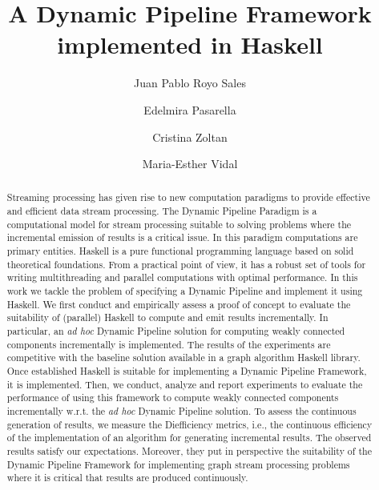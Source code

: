 \documentclass[preprint]{elsarticle}
\begin{document}
\title{A Dynamic Pipeline Framework implemented in Haskell}

%
\author[1]{Juan Pablo Royo Sales}

\author[1]{Edelmira Pasarella}

\author[1]{Cristina Zoltan}

\author[2]{Maria-Esther Vidal}



\begin{abstract}
Streaming processing has given rise to new computation paradigms to provide effective and efficient data stream processing. 
The Dynamic Pipeline Paradigm is a computational model for stream processing suitable to solving problems where the incremental emission of results is a critical  issue. In this paradigm computations are primary entities. Haskell is a pure functional programming language based on solid theoretical foundations. From a practical point of view, it has a robust set of tools for writing multithreading and parallel computations with optimal performance. In this work we tackle the problem of specifying a Dynamic Pipeline  and implement it using Haskell. We first conduct and empirically assess a proof of concept to evaluate the suitability of (parallel) Haskell to compute and emit results incrementally. In particular, an \textit{ad hoc} Dynamic Pipeline solution for computing weakly connected components incrementally is implemented. The results of the experiments are competitive with the baseline solution available in a graph algorithm Haskell library. Once established Haskell is suitable for implementing a Dynamic Pipeline Framework, it is implemented. Then, we conduct, analyze and report experiments to evaluate the performance of using this framework to compute weakly connected components incrementally w.r.t. the \textit{ad hoc}  Dynamic Pipeline solution. To assess the continuous generation of results, we measure the Diefficiency metrics, i.e., the continuous efficiency of the implementation of an algorithm for generating incremental results. The observed results satisfy our expectations. Moreover, they put in perspective the suitability of the Dynamic Pipeline Framework for implementing graph stream processing problems where it is critical that results are produced continuously. 
\end{abstract}
\end{document}
